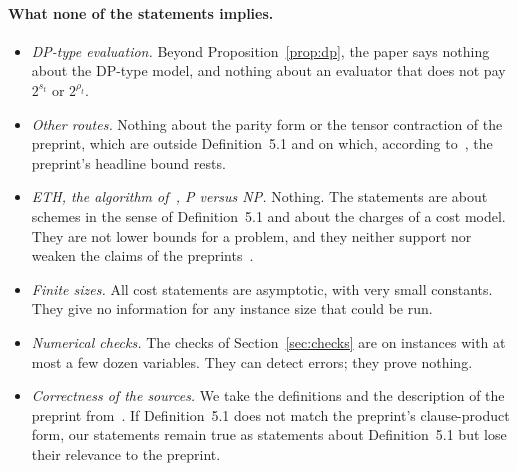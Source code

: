 \documentclass[11pt,a4paper]{article}
\theoremstyle{definition}
\theoremstyle{remark}
\begin{document}
\paragraph{What none of the statements implies.}
\begin{itemize}
\item \emph{DP-type evaluation.} Beyond Proposition~\ref{prop:dp}, the paper says nothing
 about the DP-type model, and nothing about an evaluator that does not pay $2^{s_t}$ or
 $2^{\rho_t}$.
\item \emph{Other routes.} Nothing about the parity form or the tensor contraction of the
 preprint, which are outside Definition~5.1 and on which, according to~\cite{DL}, the
 preprint's headline bound rests.
\item \emph{ETH, the algorithm of~\cite{Claude}, P versus NP.} Nothing. The statements
 are about schemes in the sense of Definition~5.1 and about the charges of a cost model.
 They are not lower bounds for a problem, and they neither support nor weaken the claims of
 the preprints~\cite{OpenAI,Claude}.
\item \emph{Finite sizes.} All cost statements are asymptotic, with very small constants.
 They give no information for any instance size that could be run.
\item \emph{Numerical checks.} The checks of Section~\ref{sec:checks} are on instances with
 at most a few dozen variables. They can detect errors; they prove nothing.
\item \emph{Correctness of the sources.} We take the definitions and the description of the
 preprint from~\cite{DL}. If Definition~5.1 does not match the preprint's clause-product
 form, our statements remain true as statements about Definition~5.1 but lose their
 relevance to the preprint.
\end{itemize}
\end{document}
